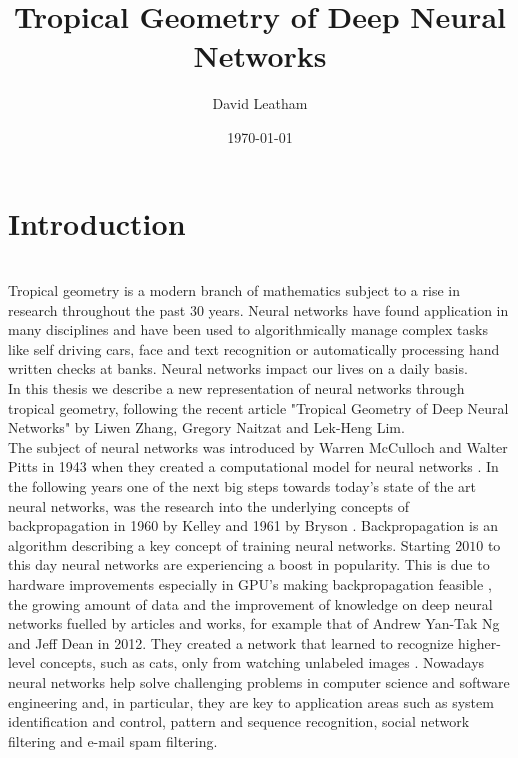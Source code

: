\documentclass{article}
\title{Tropical Geometry of Deep Neural Networks}
\author{David Leatham}
\date{\today}
\theoremstyle{definition}
\begin{document}


\newpage
  
\tableofcontents

\newpage


\section{Introduction} 
\leavevmode
\\
Tropical geometry is a modern branch of mathematics subject to a rise in research throughout the past 30 years. Neural networks have found application in many disciplines and have been used to algorithmically manage complex tasks like self driving cars, face and text recognition or automatically processing hand written checks at banks. Neural networks impact our lives on a daily basis. \\
In this thesis we describe a new representation of neural networks through tropical geometry, following the recent article "Tropical Geometry of Deep Neural Networks" by Liwen Zhang, Gregory Naitzat and Lek-Heng Lim. \\

The subject of neural networks was introduced by Warren McCulloch and Walter Pitts in 1943 when they created a computational model for neural networks \cite{mcculloch1943logical}. In the following years one of the next big steps towards today's state of the art neural networks, was the research into the underlying concepts of backpropagation in 1960 by Kelley \cite{kelley1960gradient} and 1961 by Bryson \cite{bryson1961gradient}. Backpropagation is an algorithm describing a key concept of training neural networks. Starting $2010$ to this day neural networks are experiencing a boost in popularity. This is due to hardware improvements especially in GPU's making backpropagation feasible \cite{cirecsan2010deep}, the growing amount of data and the improvement of knowledge on deep neural networks fuelled by articles and works, for example that of Andrew Yan-Tak Ng and Jeff Dean in 2012. They created a network that learned to recognize higher-level concepts, such as cats, only from watching unlabeled images \cite{DBLP:journals/corr/abs-1112-6209}. Nowadays neural networks help solve challenging problems in computer science and software engineering and, in particular, they are key to application areas such as system identification and control, pattern and sequence recognition, social network filtering and e-mail spam filtering. \\
\end{document}
